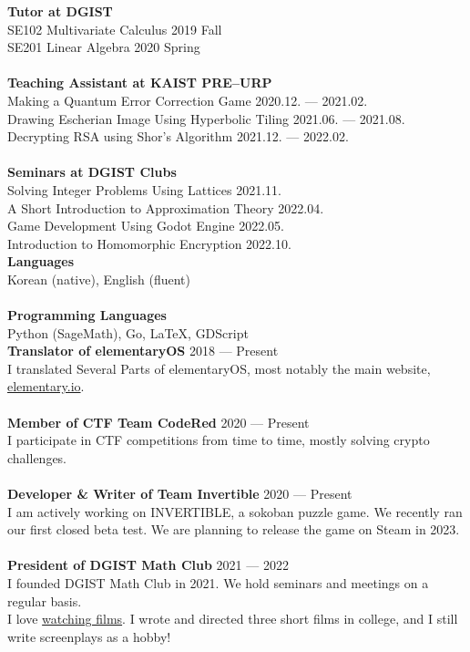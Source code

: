 \textbf{Tutor at DGIST} \\
SE102 Multivariate Calculus \hfill 2019 Fall \\
SE201 Linear Algebra \hfill 2020 Spring \\
\\
\textbf{Teaching Assistant at KAIST PRE--URP} \\
Making a Quantum Error Correction Game \hfill 2020.12. --- 2021.02. \\
Drawing Escherian Image Using Hyperbolic Tiling \hfill 2021.06. --- 2021.08. \\
Decrypting RSA using Shor's Algorithm \hfill 2021.12. --- 2022.02. \\
\\
\textbf{Seminars at DGIST Clubs} \\
Solving Integer Problems Using Lattices \hfill 2021.11. \\
A Short Introduction to Approximation Theory \hfill 2022.04. \\
Game Development Using Godot Engine \hfill 2022.05. \\
Introduction to Homomorphic Encryption \hfill 2022.10. \\

\textbf{Languages} \\
Korean (native), English (fluent) \\
\\
\textbf{Programming Languages} \\
Python (SageMath), Go, \LaTeX{}, GDScript \\

\textbf{Translator of elementaryOS} \hfill 2018 --- Present \\
I translated Several Parts of elementaryOS, most notably the main website, \href{https://elementary.io/ko/}{elementary.io}. \\
\\
\textbf{Member of CTF Team CodeRed} \hfill 2020 --- Present \\
I participate in CTF competitions from time to time, mostly solving crypto challenges. \\
\\
\textbf{Developer \& Writer of Team Invertible} \hfill 2020 --- Present \\
I am actively working on INVERTIBLE, a sokoban puzzle game. We recently ran our first closed beta test. We are planning to release the game on Steam in 2023. \\
\\
\textbf{President of DGIST Math Club} \hfill 2021 --- 2022 \\
I founded DGIST Math Club in 2021. We hold seminars and meetings on a regular basis. \\

I love \href{https://letterboxd.com/sp301415/}{watching films}. I wrote and directed three short films in college, and I still write screenplays as a hobby!


